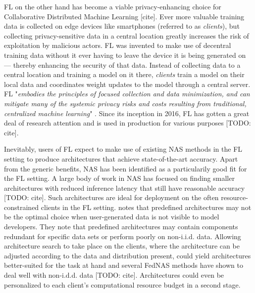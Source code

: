 FL on the other hand has become a viable privacy-enhancing choice for Collaborative Distributed Machine Learning [cite]. Ever more valuable training data is collected on edge devices like smartphones (referred to as \textit{clients}), but collecting privacy-sensitive data in a central location greatly increases the risk of exploitation by malicious actors. FL was invented to make use of decentral training data without it ever having to leave the device it is being generated on — thereby enhancing the security of that data. Instead of collecting data to a central location and training a model on it there, \textit{clients} train a model on their local data and coordinates weight updates to the model through a central server. FL "\textit{embodies the principles of focused collection and data minimization, and can mitigate many of the systemic privacy risks and costs resulting from traditional, centralized machine learning}" \cite{fl_advances_and_open_problems_2021}. Since its inception in 2016, FL has gotten a great deal of research attention and is used in production for various purposes [TODO: cite].

Inevitably, users of FL expect to make use of existing NAS methods in the FL setting to produce architectures that achieve state-of-the-art accuracy. Apart from the generic benefits, NAS has been identified as a particularily good fit for the FL setting. A large body of work in NAS has focused on finding smaller architectures with reduced inference latency that still have reasonable accuracy [TODO: cite]. Such architectures are ideal for deployment on the often resource-constrained clients in the FL setting. \cite{fl_advances_and_open_problems_2021} notes that predefined architectures may not be the optimal choice when user-generated data is not visible to model developers. They note that predefined architectures may contain components redundant for specific data sets or perform poorly on non-i.i.d. data. Allowing architecture search to take place on the clients, where the architecture can be adjusted according to the data and distribution present, could yield architectures better-suited for the task at hand and several FedNAS methods have shown to  deal well with non-i.d.d. data [TODO: cite]. Architectures could even be personalized to each client's computational resource budget in a second stage. 

